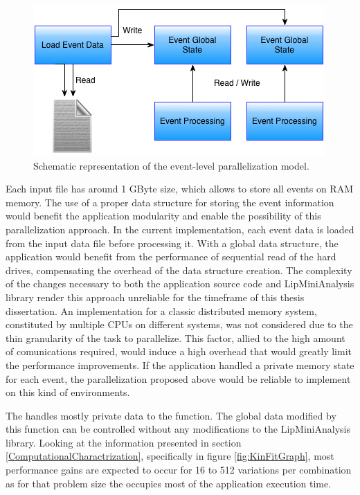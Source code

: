 \begin{figure}[!htp]
	\begin{center}
		\includegraphics[scale=0.7]{../../common/img/2global_states_par.png}
		\caption{Schematic representation of the event-level parallelization model.}
		\label{fig:EventParallelization}
	\end{center}
\end{figure}

Each input file has around 1 GByte size, which allows to store all events on RAM memory. The use of a proper data structure for storing the event information would benefit the application modularity and enable the possibility of this parallelization approach. In the current implementation, each event data is loaded from the input data file before processing it. With a global data structure, the application would benefit from the performance of sequential read of the hard drives, compensating the overhead of the data structure creation. The complexity of the changes necessary to both the application source code and LipMiniAnalysis library render this approach unreliable for the timeframe of this thesis dissertation. An implementation for a classic distributed memory system, constituted by multiple CPUs on different systems, was not considered due to the thin granularity of the task to parallelize. This factor, allied to the high amount of comunications required, would induce a high overhead that would greatly limit the performance improvements. If the application handled a private memory state for each event, the parallelization proposed above would be reliable to implement on this kind of environments.

The \ttDilepKinFit handles mostly private data to the function. The global data modified by this function can be controlled without any modifications to the LipMiniAnalysis library. Looking at the information presented in section \ref{ComputationalCharactrization}, specifically in figure \ref{fig:KinFitGraph}, most performance gains are expected to occur for 16 to 512 variations per combination as for that problem size the \ttDilepKinFit occupies most of the application execution time.

